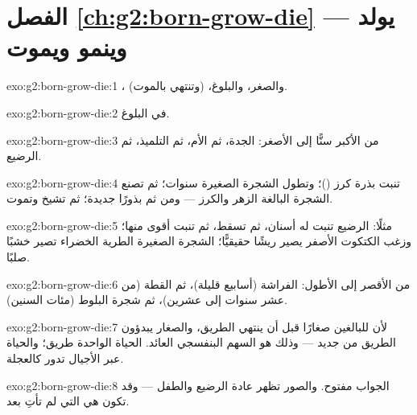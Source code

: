 \section*{الفصل \ref{ch:g2:born-grow-die} --- يولد وينمو ويموت}

\begin{solution}{exo:g2:born-grow-die:1}
، والصغر، والبلوغ،  (وتنتهي بالموت).
\end{solution}

\begin{solution}{exo:g2:born-grow-die:2}
في  البلوغ.
\end{solution}

\begin{solution}{exo:g2:born-grow-die:3}
من الأكبر سنًّا إلى الأصغر: الجدة، ثم الأم، ثم التلميذ، ثم الرضيع.
\end{solution}

\begin{solution}{exo:g2:born-grow-die:4}
تنبت بذرة كرز ()؛ وتطول الشجرة الصغيرة سنوات؛ ثم تصنع
الشجرة البالغة الزهر والكرز --- ومن ثم بذورًا جديدة؛ ثم تشيخ
وتموت.
\end{solution}

\begin{solution}{exo:g2:born-grow-die:5}
مثلًا: الرضيع تنبت له أسنان، ثم تسقط، ثم تنبت أقوى منها؛ وزغب
الكتكوت الأصفر يصير ريشًا حقيقيًّا؛  الشجرة الصغيرة الطرية
الخضراء تصير خشبًا صلبًا.
\end{solution}

\begin{solution}{exo:g2:born-grow-die:6}
من الأقصر إلى الأطول: الفراشة (أسابيع قليلة)، ثم القطة (من عشر
سنوات إلى عشرين)، ثم شجرة البلوط (مئات السنين).
\end{solution}

\begin{solution}{exo:g2:born-grow-die:7}
لأن للبالغين صغارًا قبل أن ينتهي الطريق، والصغار يبدؤون الطريق من
جديد --- وذلك هو السهم البنفسجي العائد. الحياة الواحدة طريق؛
والحياة عبر الأجيال تدور كالعجلة.
\end{solution}

\begin{solution}{exo:g2:born-grow-die:8}
الجواب مفتوح. والصور تظهر عادة الرضيع والطفل  --- وقد تكون
 هي  التي لم تأتِ بعد.
\end{solution}

